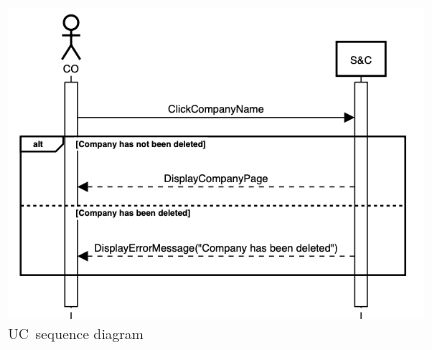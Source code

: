 \begin{figure}[h]
    \centering
    \includegraphics[width=11cm]{images/sequence-diagrams/company-views-student.png}
    \caption{UC\theuc\ sequence diagram}
\end{figure}


